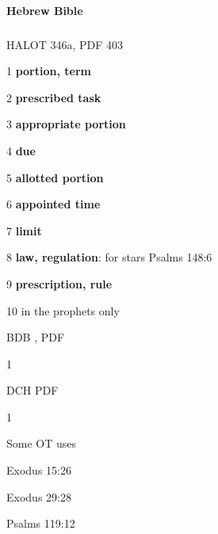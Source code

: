 		\paragraph{Hebrew Bible}
			\label{STATUTE-HEBREW}
			
			\subparagraph{\texorpdfstring{}{}} %
				\label{CHOQ} %
			
				\begin{compactdesc}
					\item[HALOT 346a, PDF 403] \textbf{}
						\begin{compactitem}
							\item[1] \textbf{portion, term}
							\item[2] \textbf{prescribed task}
							\item[3] \textbf{appropriate portion}
							\item[4] \textbf{due}
							\item[5] \textbf{allotted portion}
							\item[6] \textbf{appointed time}
							\item[7] \textbf{limit}
							\item[8] \textbf{law, regulation}: for stars Psalms 148:6
							\item[9] \textbf{prescription, rule}
							\item[10] in the prophets  only
						\end{compactitem}
					\item[BDB , PDF ] \textbf{}
						\begin{compactitem}
							\item[1]
						\end{compactitem}
					\item[DCH PDF ] \textbf{}
						\begin{compactitem}
							\item[1]
						\end{compactitem}
				\end{compactdesc}
				
				\begin{compactdesc}
					\item[Some OT uses] \textbf{}
						\begin{compactdesc}
							\item[Exodus 15:26]
							\item[Exodus 29:28]
							\item[Psalms 119:12] 
						\end{compactdesc}
				\end{compactdesc}	
		
